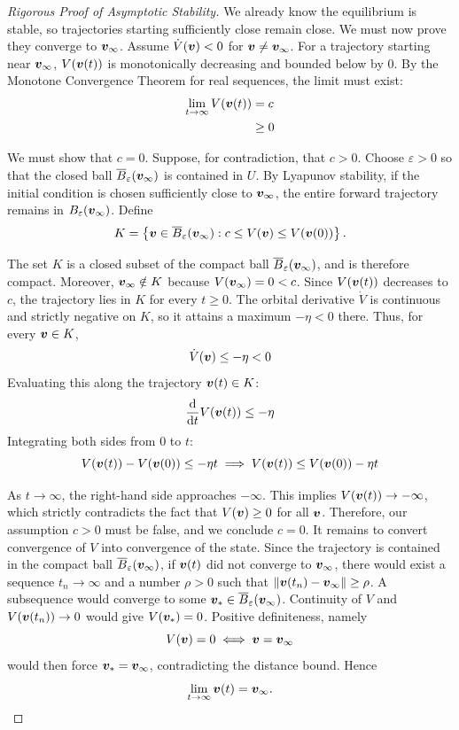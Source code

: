 \begin{proof}[Rigorous Proof of Asymptotic Stability]
We already know the equilibrium is stable, so trajectories starting sufficiently close remain close. We must now prove they converge to $\bm{v}_\infty$.
Assume $\dot{V}(\bm{v}) < 0$ for $\bm{v} \neq \bm{v}_\infty$. For a trajectory starting near $\bm{v}_\infty$, $V(\bm{v}(t))$ is monotonically decreasing and bounded below by $0$. By the Monotone Convergence Theorem for real sequences, the limit must exist:
\begin{equation}
\begin{aligned}
\lim_{t \to \infty} V(\bm{v}(t)) &= c \\
&\geq 0
\end{aligned}
\end{equation}

We must show that $c = 0$. Suppose, for contradiction, that $c > 0$. Choose $\varepsilon>0$ so that the closed ball $\overline{B}_\varepsilon(\bm{v}_\infty)$ is contained in $U$. By Lyapunov stability, if the initial condition is chosen sufficiently close to $\bm{v}_\infty$, the entire forward trajectory remains in $B_\varepsilon(\bm{v}_\infty)$. Define
\[
K = \left\{\bm{v}\in\overline{B}_\varepsilon(\bm{v}_\infty):
c\leq V(\bm{v})\leq V(\bm{v}(0))\right\}.
\]

The set $K$ is a closed subset of the compact ball $\overline{B}_\varepsilon(\bm{v}_\infty)$, and is therefore compact. Moreover, $\bm{v}_\infty \notin K$ because $V(\bm{v}_\infty) = 0 < c$. Since $V(\bm{v}(t))$ decreases to $c$, the trajectory lies in $K$ for every $t\geq0$. The orbital derivative $\dot{V}$ is continuous and strictly negative on $K$, so it attains a maximum $-\eta<0$ there. Thus, for every $\bm{v} \in K$,
\begin{equation}
\dot{V}(\bm{v}) \leq -\eta < 0
\end{equation}
Evaluating this along the trajectory $\bm{v}(t) \in K$:
\begin{equation}
\frac{\mathrm{d}}{\mathrm{d} t} V(\bm{v}(t)) \leq -\eta
\end{equation}
Integrating both sides from $0$ to $t$:
\begin{equation}
V(\bm{v}(t)) - V(\bm{v}(0)) \leq -\eta t \implies V(\bm{v}(t)) \leq V(\bm{v}(0)) - \eta t
\end{equation}

As $t \to \infty$, the right-hand side approaches $-\infty$. This implies $V(\bm{v}(t)) \to -\infty$, which strictly contradicts the fact that $V(\bm{v}) \geq 0$ for all $\bm{v}$.
Therefore, our assumption $c > 0$ must be false, and we conclude $c = 0$.
It remains to convert convergence of $V$ into convergence of the state. Since the trajectory is contained in the compact ball $\overline{B}_\varepsilon(\bm{v}_\infty)$, if $\bm{v}(t)$ did not converge to $\bm{v}_\infty$, there would exist a sequence $t_n\to\infty$ and a number $\rho>0$ such that $\|\bm{v}(t_n)-\bm{v}_\infty\|\geq\rho$. A subsequence would converge to some $\bm{v}_*\in\overline{B}_\varepsilon(\bm{v}_\infty)$. Continuity of $V$ and $V(\bm{v}(t_n))\to0$ would give $V(\bm{v}_*)=0$. Positive definiteness, namely
\[
V(\bm{v}) = 0 \iff \bm{v} = \bm{v}_\infty
\]
would then force $\bm{v}_*=\bm{v}_\infty$, contradicting the distance bound. Hence
\[
\lim_{t \to \infty} \bm{v}(t) = \bm{v}_\infty.
\]

\end{proof}


